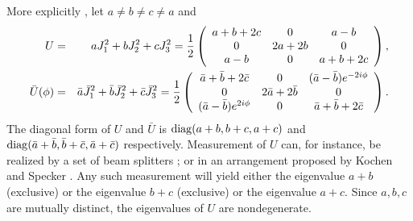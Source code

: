 More explicitly \cite{kochen2,svozil-ql}, let $a\neq b\neq c\neq a$ and
\begin{eqnarray}
U&=&aJ_1^2+bJ_2^2+cJ_3^2=
 {1\over 2}
\left(
\begin{array}{ccc}
a+b+2c&0&a-b\\
0&2a+2b&0\\
a-b&0&a+b+2c
\end{array}
\right),
\label{le-ndfuo}\\
\bar U (\phi)&=& \bar a\bar J_1^2+\bar b\bar J_2^2+\bar c\bar J_3^2=
 {1\over 2}
\left(
\begin{array}{ccc}
\bar a + \bar b + 2 \bar c      & 0        & (\bar a - \bar b)e^{-2i\phi}\\
0                & 2\bar a + 2\bar b  & 0 \\
(\bar a - \bar b)e^{2i\phi} & 0        &\bar a + \bar b + 2 \bar c
\end{array}
\right).
\end{eqnarray}
The diagonal form of $U$ and $\bar U$ is
${\rm diag}(a+b,b+c,a+c)$
and
${\rm diag}(\bar a+\bar b,\bar b+\bar c,\bar a+\bar c)$
respectively.
Measurement of $U$  can, for instance, be realized by a set
of beam splitters
\cite{rzbb}; or in an arrangement proposed by Kochen and Specker
\cite{kochen1}.
Any such measurement will yield either the eigenvalue
$a+b$  (exclusive) or the eigenvalue
$b+c$  (exclusive) or the eigenvalue
$a+c$.
Since $a,b,c$ are mutually distinct, the eigenvalues
of $U$ are nondegenerate.

